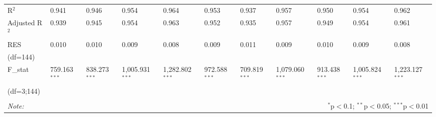 \begin{table}[H]
\begin{tabularx}{\textwidth}{XXXXXXXXXXl}
R$^{2}$ & 0.941 & 0.946 & 0.954 & 0.964 & 0.953 & 0.937 & 0.957 & 0.950 & 0.954 & 0.962 \\ 
Adjusted R$^{2}$ & 0.939 & 0.945 & 0.954 & 0.963 & 0.952 & 0.935 & 0.957 & 0.949 & 0.954 & 0.961 \\ 
RES & 0.010 & 0.010 & 0.009 & 0.008 & 0.009 & 0.011 & 0.009 & 0.010 & 0.009 & 0.008 \\ 
(df=144) & & & & & & & & & & \\
F_{stat} & 759.163$^{***}$ & 838.273$^{***}$ & 1,005.931$^{***}$ & 1,282.802$^{***}$ & 972.588$^{***}$ & 709.819$^{***}$ & 1,079.060$^{***}$ & 913.438$^{***}$ & 1,005.824$^{***}$ & 1,223.127$^{***}$ \\ 
(df=3;144) & & & & & & & & & & \\
\hline 
\hline \\[-1.8ex] 
\textit{Note:}  & \multicolumn{10}{r}{$^{*}$p$<$0.1; $^{**}$p$<$0.05; $^{***}$p$<$0.01} \\ 
\end{tabularx} 
\end{table} 


